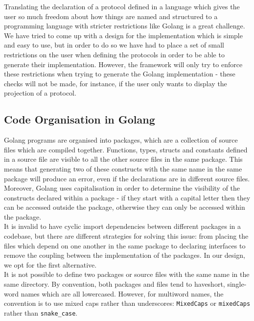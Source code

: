 \documentclass[12pt,twoside]{report}
\begin{document}
Translating the declaration of a protocol defined in a language which gives the user so much freedom about how things are named and structured to a programming language with stricter restrictions like Golang is a great challenge. We have tried to come up with a design for the implementation which is simple and easy to use, but in order to do so we have had to place a set of small restrictions on the user when defining the protocols in order to be able to generate their implementation. However, the framework will only try to enforce these restrictions when trying to generate the Golang implementation - these checks will not be made, for instance, if the user only wants to display the projection of a protocol.

\subsection{Code Organisation in Golang}

Golang programs are organised into packages, which are a collection of source files which are compiled together. Functions, types, structs and constants defined in a source file are visible to all the other source files in the same package\cite{godocs}. This means that generating two of these constructs with the same name in the same package will produce an error, even if the declarations are in different source files. Moreover, Golang uses capitalisation in order to determine the visibility of the constructs declared within a package - if they start with a capital letter then they can be accessed outside the package, otherwise they can only be accessed within the package.\\

It is invalid to have cyclic import dependencies between different packages in a codebase, but there are different strategies for solving this issue: from placing the files which depend on one another in the same package to declaring interfaces to remove the coupling between the implementation of the packages. In our design, we opt for the first alternative.\\

It is not possible to define two packages or source files with the same name in the same directory. By convention, both packages and files tend to haveshort, single-word names which are all lowercased. However, for multiword names, the convention is to use mixed caps rather than underscores: \texttt{MixedCaps} or \texttt{mixedCaps} rather than \texttt{snake\_case}.\\
\end{document}
